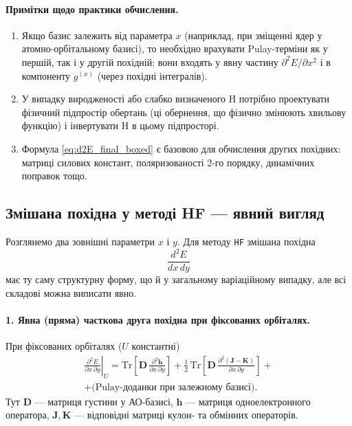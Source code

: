 \documentclass{PySCFBook}
\begin{document}
\paragraph{Примітки щодо практики обчислення.}
\begin{enumerate}
    \item Якщо базис залежить від параметра $x$ (наприклад, при зміщенні ядер у атомно-орбітальному базисі), то необхідно врахувати Pulay-терміни як у першій, так і у другій похідній; вони входять у явну частину $\partial^2E/\partial x^2$ і в компоненту $g^{(x)}$ (через похідні інтегралів).
    \item У випадку виродженості або слабко визначеного H потрібно проектувати фізичний підпростір обертань (ці обернення, що фізично змінюють хвильову функцію) і інвертувати H в цьому підпросторі.
    \item Формула \eqref{eq:d2E_final_boxed} є базовою для обчислення других похідних: матриці силових констант, поляризованості 2-го порядку, динамічних поправок тощо.
\end{enumerate}


\subsection{Змішана похідна у методі HF — явний вигляд}

Розглянемо два зовнішні параметри $x$ і $y$. Для методу \texttt{HF} змішана похідна
\[
\frac{d^2E}{dx\,dy}
\]
має ту саму структурну форму, що й у загальному варіаційному випадку, але всі складові можна виписати явно.

\paragraph{1. Явна (пряма) часткова друга похідна при фіксованих орбіталях.}
При фіксованих орбіталях ($U$ константні)
\begin{multline}\label{eq:explicit_partial_xy}
\left.\frac{\partial^2 E}{\partial x\,\partial y}\right|_{U}
=
\mathrm{Tr}\!\left[\mathbf D\,\frac{\partial^2\mathbf h}{\partial x\,\partial y}\right]
+\tfrac12\,\mathrm{Tr}\!\left[\mathbf D\,\frac{\partial^2(\mathbf J-\mathbf K)}{\partial x\,\partial y}\right]
+ \\ + \text{(Pulay-доданки при залежному базисі)}.
\end{multline}
Тут $\mathbf D$ — матриця густини у АО-базисі, $\mathbf h$ — матриця одноелектронного оператора, $\mathbf J,\mathbf K$ — відповідні матриці кулон- та обмінних операторів.
\end{document}
